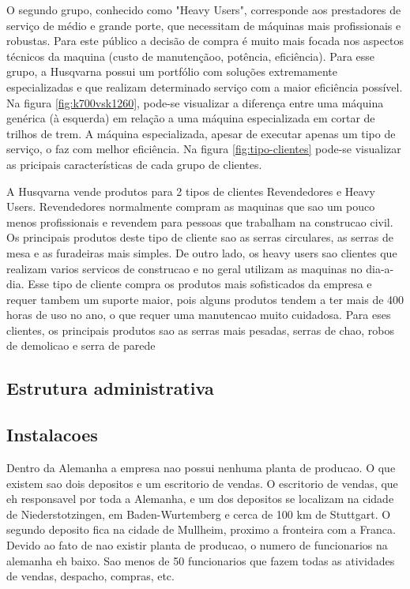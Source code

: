 \documentclass[12pt]{article}
\begin{document}
	O segundo grupo, conhecido como "Heavy Users", corresponde aos prestadores de serviço de médio e grande porte, que necessitam de máquinas mais profissionais e robustas. Para este público a decisão de compra é muito mais focada nos aspectos técnicos da maquina (custo de manutençãoo, potência, eficiência). Para esse grupo, a Husqvarna possui um portfólio com soluções extremamente especializadas e que realizam determinado serviço com a maior eficiência possível. Na figura \ref{fig:k700vsk1260}, pode-se visualizar a diferença entre uma máquina genérica (à esquerda) em relação a uma máquina especializada em cortar de trilhos de trem. A máquina especializada, apesar de executar apenas um tipo de serviço, o faz com melhor eficiência. Na figura \ref{fig:tipo-clientes} pode-se visualizar as pricipais características de cada grupo de clientes.
	


A Husqvarna vende produtos para 2 tipos de clientes Revendedores e Heavy Users. Revendedores normalmente compram as maquinas que sao um pouco menos profissionais e revendem para pessoas que trabalham na construcao civil. Os principais produtos deste tipo de cliente sao as serras circulares, as serras de mesa e as furadeiras mais simples. De outro lado, os heavy users sao clientes que realizam varios servicos de construcao e no geral utilizam as maquinas no dia-a-dia. Esse tipo de cliente compra os produtos mais sofisticados da empresa e requer tambem um suporte maior, pois alguns produtos tendem a ter mais de 400 horas de uso no ano, o que requer uma manutencao muito cuidadosa. Para eses clientes, os principais produtos sao as serras mais pesadas, serras de chao, robos de demolicao e serra de parede

\subsection{Estrutura administrativa}


\subsection{Instalacoes}
Dentro da Alemanha a empresa nao possui nenhuma planta de producao. O que existem sao dois depositos e um escritorio de vendas. O escritorio de vendas, que eh responsavel por toda a Alemanha, e um dos depositos se localizam na cidade de Niederstotzingen, em Baden-Wurtemberg e cerca de 100 km de Stuttgart. O segundo deposito fica na cidade de Mullheim, proximo a fronteira com a Franca.
Devido ao fato de nao existir planta de producao, o numero de funcionarios na alemanha eh baixo. Sao menos de 50 funcionarios que fazem todas as atividades de vendas, despacho, compras, etc.
\end{document}
